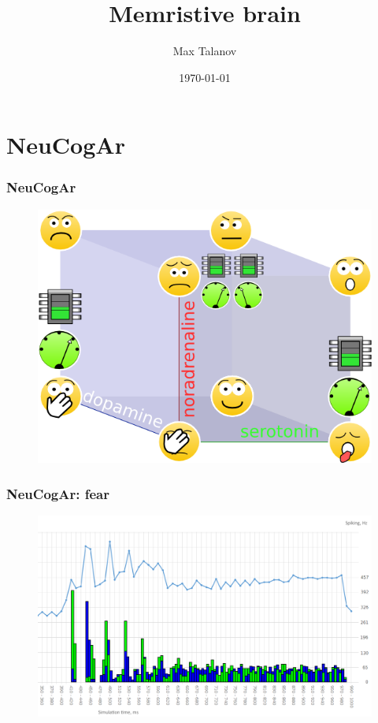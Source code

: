 \documentclass[12pt, aspectratio=169]{beamer}
\title[Memristive brain]{Memristive brain} %
\author[Max Talanov]{
  Max Talanov
}
\institute[Neurobiology laboratory, ITIS: KFU]%
{
ITIS/Neurobiology laboratory, KFU \\ %
\medskip
\textit{max.talanov@gmail.com} %
}
\date{\today} %
\begin{document}
\begin{frame}
\titlepage %
\end{frame}

\section{NeuCogAr}
\begin{frame}
  \frametitle{NeuCogAr}
  \begin{figure}
    \includegraphics[width=0.55\linewidth]{cube_of_emotional_parameters_machine}
  \end{figure}
\end{frame}
\begin{frame}
  \frametitle{NeuCogAr: fear}
  \begin{figure}
    \includegraphics[width=0.8\linewidth]{resultBIG_short}
  \end{figure}
\end{frame}
\end{document}
